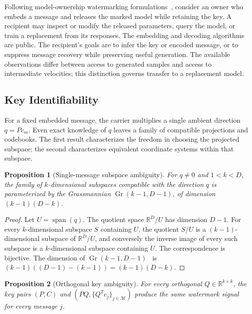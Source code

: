 \documentclass[11pt]{article}
\newtheorem{proposition}{Proposition}
\begin{document}
Following model-ownership watermarking
formulations~\cite{uchida2017embedding,adi2018turning}, consider an owner
who embeds a message and releases the marked model while retaining
the key. A recipient may inspect or modify the released parameters,
query the model, or train a replacement from its responses. The
embedding and decoding algorithms are public. The recipient's goals
are to infer the key or encoded message, or to suppress message
recovery while preserving useful generation. The available
observations differ between access to generated samples and access
to intermediate velocities; this distinction governs transfer to a
replacement model.

\subsection{Key Identifiability}\label{sec:key-identifiability}

For a fixed embedded message, the carrier multiplies a single ambient
direction $q=Pc_m$. Even exact knowledge of $q$ leaves a family of
compatible projections and codebooks. The first result characterizes
the freedom in choosing the projected subspace; the second
characterizes equivalent coordinate systems within that subspace.

\begin{proposition}[Single-message subspace ambiguity]
\label{prop:subspace_search}
For $q\ne0$ and $1<k<D$, the family of $k$-dimensional subspaces
compatible with the direction $q$ is parameterized by the Grassmannian
$\operatorname{Gr}(k-1,D-1)$, of dimension
$(k-1)(D-k)$.
\end{proposition}

\begin{proof}
Let $U=\operatorname{span}(q)$. The quotient space
$\mathbb{R}^D/U$ has dimension $D-1$. For every $k$-dimensional
subspace $S$ containing $U$, the quotient $S/U$ is a $(k-1)$-dimensional
subspace of $\mathbb{R}^D/U$, and conversely the inverse image of
every such subspace is a $k$-dimensional subspace containing $U$.
The correspondence is bijective. The dimension of
$\operatorname{Gr}(k-1,D-1)$~\cite{zheng2002communication} is
$(k-1)((D-1)-(k-1))=(k-1)(D-k)$.
\end{proof}

\begin{proposition}[Orthogonal key ambiguity]\label{prop:P_hidden}
For every orthogonal $Q\in\mathbb{R}^{k\times k}$, the key pairs
$(P,C)$ and $(P Q,\{Q^T c_j\}_{j\in\mathcal M})$ produce the same
watermark signal for every message $j$.
\end{proposition}
\end{document}

